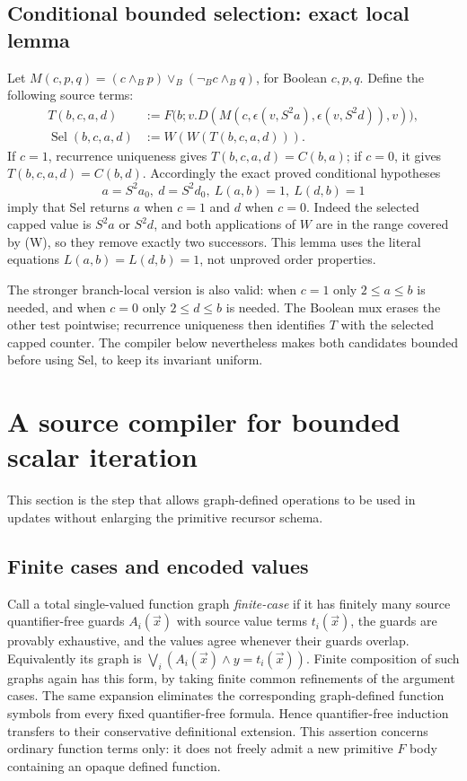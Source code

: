 \documentclass[11pt,letterpaper]{article}
\theoremstyle{definition}\newtheorem{definition}[theorem]{Definition}
\theoremstyle{remark}\newtheorem{remark}[theorem]{Remark}
\begin{document}
\subsection{Conditional bounded selection: exact local lemma}
Let $M(c,p,q)=(c\wedge_Bp)\vee_B(\neg_Bc\wedge_Bq)$, for Boolean
$c,p,q$. Define the following source terms:
\[
\begin{split}
T(b,c,a,d)&:=F\bigl(b;v.D(M(c,\epsilon(v,S^2a),
                                  \epsilon(v,S^2d)),v)\bigr),\\
\operatorname{Sel}(b,c,a,d)&:=W(W(T(b,c,a,d))).
\end{split}
\]
If $c=1$, recurrence uniqueness gives $T(b,c,a,d)=C(b,a)$;
if $c=0$, it gives $T(b,c,a,d)=C(b,d)$. Accordingly the exact proved
conditional hypotheses
\[
 a=S^2a_0,\ d=S^2d_0,\ L(a,b)=1,\ L(d,b)=1
\]
imply that Sel returns $a$ when $c=1$ and $d$ when $c=0$.
Indeed the selected capped value is $S^2a$ or $S^2d$, and both
applications of $W$ are in the range covered by (W), so they remove
exactly two successors. This lemma uses the literal equations
$L(a,b)=L(d,b)=1$, not unproved order properties.

The stronger branch-local version is also valid: when $c=1$ only
$2\le a\le b$ is needed, and when $c=0$ only $2\le d\le b$ is
needed. The Boolean mux erases the other test pointwise; recurrence
uniqueness then identifies $T$ with the selected capped counter. The
compiler below nevertheless makes both candidates bounded before
using Sel, to keep its invariant uniform.

\section{A source compiler for bounded scalar iteration}
\label{sec:selfseed-bounded}
This section is the step that allows graph-defined operations to be
used in updates without enlarging the primitive recursor schema.

\subsection{Finite cases and encoded values}
Call a total single-valued function graph \emph{finite-case} if it has
finitely many source quantifier-free guards $A_i(\vec x)$ with source
value terms $t_i(\vec x)$, the guards are provably exhaustive, and
the values agree whenever their guards overlap. Equivalently its
graph is $\bigvee_i(A_i(\vec x)\wedge y=t_i(\vec x))$.
Finite composition of such graphs again has this form, by taking
finite common refinements of the argument cases. The same expansion
eliminates the corresponding graph-defined function symbols from
every fixed quantifier-free formula. Hence quantifier-free induction
transfers to their conservative definitional extension. This assertion
concerns ordinary function terms only: it does not freely admit a
new primitive $F$ body containing an opaque defined function.
\end{document}
